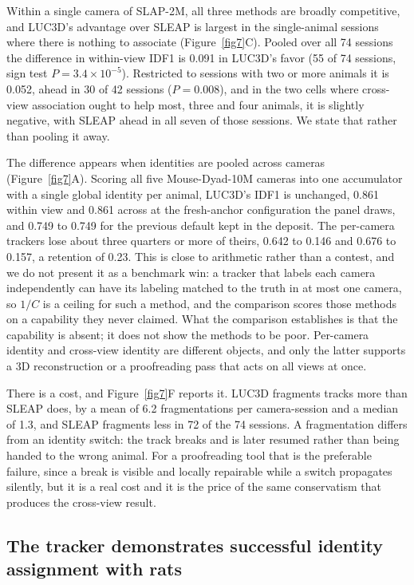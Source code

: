 \documentclass[pdflatex, sn-nature]{sn-jnl}
\theoremstyle{thmstyleone}%
\theoremstyle{thmstyletwo}%
\theoremstyle{thmstylethree}%
\begin{document}
Within a single camera of SLAP-2M, all three methods are broadly competitive, and LUC3D's advantage over SLEAP is largest in the single-animal sessions where there is nothing to associate (Figure~\ref{fig7}C). Pooled over all 74 sessions the difference in within-view IDF1 is 0.091 in LUC3D's favor (55 of 74 sessions, sign test $P = 3.4 \times 10^{-5}$). Restricted to sessions with two or more animals it is 0.052, ahead in 30 of 42 sessions ($P = 0.008$), and in the two cells where cross-view association ought to help most, three and four animals, it is slightly negative, with SLEAP ahead in all seven of those sessions. We state that rather than pooling it away.

The difference appears when identities are pooled across cameras (Figure~\ref{fig7}A). Scoring all five Mouse-Dyad-10M cameras into one accumulator with a single global identity per animal, LUC3D's IDF1 is unchanged, 0.861 within view and 0.861 across at the fresh-anchor configuration the panel draws, and 0.749 to 0.749 for the previous default kept in the deposit. The per-camera trackers lose about three quarters or more of theirs, 0.642 to 0.146 and 0.676 to 0.157, a retention of 0.23. This is close to arithmetic rather than a contest, and we do not present it as a benchmark win: a tracker that labels each camera independently can have its labeling matched to the truth in at most one camera, so $1/C$ is a ceiling for such a method, and the comparison scores those methods on a capability they never claimed. What the comparison establishes is that the capability is absent; it does not show the methods to be poor. Per-camera identity and cross-view identity are different objects, and only the latter supports a 3D reconstruction or a proofreading pass that acts on all views at once.

There is a cost, and Figure~\ref{fig7}F reports it. LUC3D fragments tracks more than SLEAP does, by a mean of 6.2 fragmentations per camera-session and a median of 1.3, and SLEAP fragments less in 72 of the 74 sessions. A fragmentation differs from an identity switch: the track breaks and is later resumed rather than being handed to the wrong animal. For a proofreading tool that is the preferable failure, since a break is visible and locally repairable while a switch propagates silently, but it is a real cost and it is the price of the same conservatism that produces the cross-view result.

\subsection{The tracker demonstrates successful identity assignment with rats}\label{subsec2-8}
\end{document}
